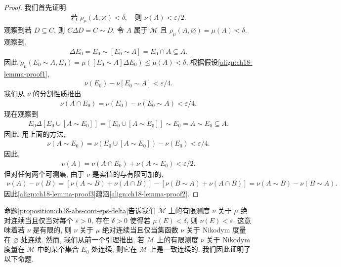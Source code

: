 \documentclass[../../main.tex]{subfiles}
\begin{document}
\begin{proof}
我们首先证明:
\begin{align}
\text{若 }\rho_{\mu}(A,\varnothing)<\delta,\quad\text{则 }\nu(A)<\varepsilon/2.\label{align:ch18-lemma-proof3}
\end{align}
观察到若 $D\subseteq C$, 则 $C\Delta D=C\sim D$. 令 $A$ 属于 $\mathcal{M}$ 且 $\rho_{\mu}(A,\varnothing)=\mu(A)<\delta$. 观察到,
\begin{align*}
[E_{0}\sim A]\Delta E_{0}=E_{0}\sim[E_{0}\sim A]=E_{0}\cap A\subseteq A.
\end{align*}
因此 $\rho_{\mu}(E_{0}\sim A,E_{0})=\mu([E_{0}\sim A]\Delta E_{0})\leqslant\mu(A)<\delta$, 根据假设\eqref{align:ch18-lemma-proof1},
\begin{align*}
\nu(E_{0})-\nu[E_{0}\sim A]<\varepsilon/4.
\end{align*}
我们从 $\nu$ 的分割性质推出
\begin{align*}
\nu(A\cap E_{0})=\nu(E_{0})-\nu(E_{0}\sim A)<\varepsilon/4.
\end{align*}
现在观察到
\begin{align*}
E_{0}\Delta[E_{0}\cup[A\sim E_{0}]]=[E_{0}\cup[A\sim E_{0}]]\sim E_{0}=A\sim E_{0}\subseteq A.
\end{align*}
因此, 用上面的方法,
\begin{align*}
\nu(A\sim E_{0})=\nu(E_{0}\cup[A\sim E_{0}])-\nu(E_{0})<\varepsilon/4.
\end{align*}
因此,
\begin{align*}
\nu(A)=\nu(A\cap E_{0})+\nu(A\sim E_{0})<\varepsilon/2.
\end{align*}
但对任何两个可测集, 由于 $\nu$ 是实值的与有限可加的,
\begin{align*}
\nu(A)-\nu(B)=[\nu(A\sim B)+\nu(A\cap B)]-[\nu(B\sim A)+\nu(A\cap B)]=\nu(A\sim B)-\nu(B\sim A).
\end{align*}
因此\eqref{align:ch18-lemma-proof3}蕴涵\eqref{align:ch18-lemma-proof2}.
\end{proof}

命题\cref{proposition:ch18-abs-cont-eps-delta}告诉我们 $\mathcal{M}$ 上的有限测度 $\nu$ 关于 $\mu$ 绝对连续当且仅当对每个 $\varepsilon>0$, 存在 $\delta>0$ 使得若 $\mu(E)<\delta$, 则 $\nu(E)<\varepsilon$. 这意味着若 $\nu$ 是有限的, 则 $\nu$ 关于 $\mu$ 绝对连续当且仅当集函数 $\nu$ 关于 Nikodym 度量在 $\varnothing$ 处连续. 然而, 我们从前一个引理推出, 若 $\mathcal{M}$ 上的有限测度 $\nu$ 关于 Nikodym 度量在 $\mathcal{M}$ 中的某个集合 $E_{0}$ 处连续, 则它在 $\mathcal{M}$ 上是一致连续的. 我们因此证明了以下命题.
\end{document}
